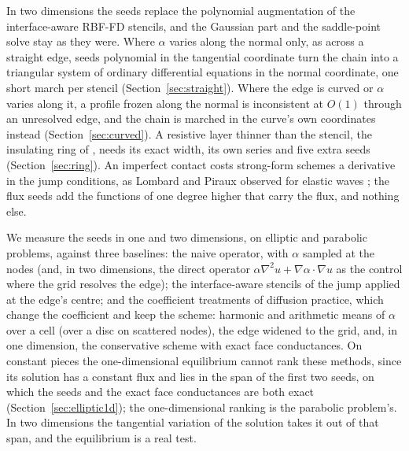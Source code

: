 \documentclass[11pt]{amsart}
\theoremstyle{definition}
\theoremstyle{remark}
\begin{document}
In two dimensions the seeds replace the polynomial augmentation of the
interface-aware RBF-FD stencils, and the Gaussian part and the
saddle-point solve stay as they were. Where $\alpha$ varies along the
normal only, as across a straight edge, seeds polynomial in the tangential
coordinate turn the chain into a triangular system of ordinary differential
equations in the normal coordinate, one short march per stencil
(Section~\ref{sec:straight}). Where the edge is curved or $\alpha$ varies
along it, a profile frozen along the normal is inconsistent at $O(1)$
through an unresolved edge, and the chain is marched in the curve's own
coordinates instead (Section~\ref{sec:curved}). A resistive layer thinner
than the stencil, the insulating ring of \cite{MartinFornberg2017heat},
needs its exact width, its own series and five extra seeds
(Section~\ref{sec:ring}). An imperfect contact costs
strong-form schemes a derivative in the jump conditions, as Lombard and
Piraux observed for elastic waves \cite{LombardPiraux2003,LombardPiraux2006};
the flux seeds add the functions of one degree higher that carry the flux,
and nothing else.

We measure the seeds in one and two dimensions, on elliptic and parabolic
problems, against three baselines: the naive operator, with $\alpha$
sampled at the nodes (and, in two dimensions, the direct operator
$\alpha \nabla^2 u + \nabla \alpha \cdot \nabla u$ as the control where the
grid resolves the edge); the interface-aware stencils of the jump applied at
the edge's centre; and the coefficient treatments of diffusion practice,
which change the coefficient and keep the scheme: harmonic and arithmetic
means of $\alpha$ over a cell (over a disc on scattered nodes), the edge
widened to the grid, and, in one dimension, the conservative scheme with
exact face conductances. On constant pieces the one-dimensional equilibrium
cannot rank these methods, since its solution has a constant flux and lies
in the span of the first two seeds, on which the seeds and the exact face
conductances are both exact (Section~\ref{sec:elliptic1d}); the
one-dimensional ranking is the parabolic problem's. In two dimensions the
tangential variation of the solution takes it out of that span, and the
equilibrium is a real test.
\end{document}
